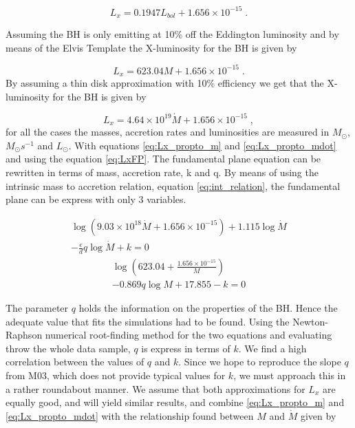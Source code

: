 \begin{equation}
L_{x}=0.1947L_{bol}+1.656\times10^{-15}\;.
\end{equation}


Assuming the BH is only emitting at 10\% off the Eddington luminosity
and by means of the Elvis Template the X-luminosity for the BH is
given by

\begin{equation}
L_{x}=623.04M+1.656\times10^{-15}\;.\label{eq:Lx_propto_m}
\end{equation}
By assuming a thin disk approximation with 10\% efficiency we get
that the X-luminosity for the BH is given by

\begin{equation}
L_{x}=4.64\times10^{19}\dot{M}+1.656\times10^{-15}\;,\label{eq:Lx_propto_mdot}
\end{equation}
for all the cases the masses, accretion rates and luminosities are
measured in $M_{\odot}$, $M_{\odot}s^{-1}$ and $L_{\odot}$. With
equations \ref{eq:Lx_propto_m} and \ref{eq:Lx_propto_mdot} and using
the equation \ref{eq:LxFP}. The fundamental plane equation can be
rewritten in terms of mass, accretion rate, k and q. By means of using
the intrinsic mass to accretion relation, equation \ref{eq:int_relation},
the fundamental plane can be express with only 3 variables.

\begin{multline}
\log\left(9.03\times10^{18}\dot{M}+1.656\times10^{-15}\right)+1.115\log\dot{M}\\
-\frac{e}{d}q\log\dot{M}+k=0
\end{multline}
\begin{multline}
\log\left(623.04+\frac{1.656\times10^{-15}}{M}\right)\\
-0.869q\log M+17.855-k=0
\end{multline}


The parameter $q$ holds the information on the properties of the
BH. Hence the adequate value that fits the simulations had to be found.
Using the Newton-Raphson numerical root-finding method for the two
equations and evaluating throw the whole data sample, $q$ is express
in terms of $k$. We find a high correlation between the values of
$q$ and $k$. Since we hope to reproduce the slope $q$ from M03,
which does not provide typical values for $k$, we must approach this
in a rather roundabout manner. We assume that both approximations
for $L_{x}$ are equally good, and will yield similar results, and
combine \ref{eq:Lx_propto_m} and \ref{eq:Lx_propto_mdot} with the
relationship found between $M$ and $\dot{M}$ given by


